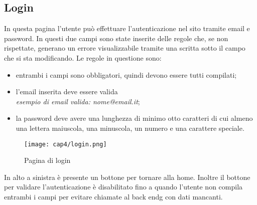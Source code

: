 \subsection{Login}
In questa pagina l'utente può effettuare l'autenticazione nel sito tramite email e password. In questi due campi sono state inserite delle regole che, se non rispettate, generano un errore visualizzabile tramite una scritta sotto il campo che si sta modificando. Le regole in questione sono:
\begin{itemize}
	\item entrambi i campi sono obbligatori, quindi devono essere tutti compilati;
	\item l'email inserita deve essere valida\\
	\textit{esempio di email valida: nome@email.it};
	\item la password deve avere una lunghezza di minimo otto caratteri di cui almeno una lettera maiuscola, una minuscola, un numero e una carattere speciale.
\end{itemize}
\begin{figure}[H]
	\begin{center}
		\texttt{[image: cap4/login.png]}
		\caption{Pagina di login}
	\end{center}
\end{figure}
In alto a sinistra è presente un bottone per tornare alla home. Inoltre il bottone per validare l'autenticazione è disabilitato fino a quando l'utente non compila entrambi i campi per evitare chiamate al \gls{back endg} con dati mancanti.
